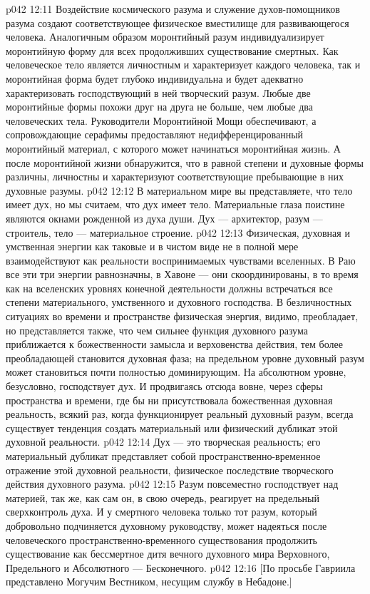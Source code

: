 \vs p042 12:11 Воздействие космического разума и служение духов\hyp{}помощников разума создают соответствующее физическое вместилище для развивающегося человека. Аналогичным образом моронтийный разум индивидуализирует моронтийную форму для всех продолживших существование смертных. Как человеческое тело является личностным и характеризует каждого человека, так и моронтийная форма будет глубоко индивидуальна и будет адекватно характеризовать господствующий в ней творческий разум. Любые две моронтийные формы похожи друг на друга не больше, чем любые два человеческих тела. Руководители Моронтийной Мощи обеспечивают, а сопровождающие серафимы предоставляют недифференцированный моронтийный материал, с которого может начинаться моронтийная жизнь. А после моронтийной жизни обнаружится, что в равной степени и духовные формы различны, личностны и характеризуют соответствующие пребывающие в них духовные разумы.
\vs p042 12:12 \pc В материальном мире вы представляете, что тело имеет дух, но мы считаем, что дух имеет тело. Материальные глаза поистине являются окнами рожденной из духа души. Дух --- архитектор, разум --- строитель, тело --- материальное строение.
\vs p042 12:13 \pc Физическая, духовная и умственная энергии как таковые и в чистом виде не в полной мере взаимодействуют как реальности воспринимаемых чувствами вселенных. В Раю все эти три энергии равнозначны, в Хавоне --- они скоординированы, в то время как на вселенских уровнях конечной деятельности должны встречаться все степени материального, умственного и духовного господства. В безличностных ситуациях во времени и пространстве физическая энергия, видимо, преобладает, но представляется также, что чем сильнее функция духовного разума приближается к божественности замысла и верховенства действия, тем более преобладающей становится духовная фаза; на предельном уровне духовный разум может становиться почти полностью доминирующим. На абсолютном уровне, безусловно, господствует дух. И продвигаясь отсюда вовне, через сферы пространства и времени, где бы ни присутствовала божественная духовная реальность, всякий раз, когда функционирует реальный духовный разум, всегда существует тенденция создать материальный или физический дубликат этой духовной реальности.
\vs p042 12:14 Дух --- это творческая реальность; его материальный дубликат представляет собой пространственно\hyp{}временное отражение этой духовной реальности, физическое последствие творческого действия духовного разума.
\vs p042 12:15 Разум повсеместно господствует над материей, так же, как сам он, в свою очередь, реагирует на предельный сверхконтроль духа. И у смертного человека только тот разум, который добровольно подчиняется духовному руководству, может надеяться после человеческого пространственно\hyp{}временного существования продолжить существование как бессмертное дитя вечного духовного мира Верховного, Предельного и Абсолютного --- Бесконечного.
\vsetoff
\vs p042 12:16 [По просьбе Гавриила представлено Могучим Вестником, несущим службу в Небадоне.]
